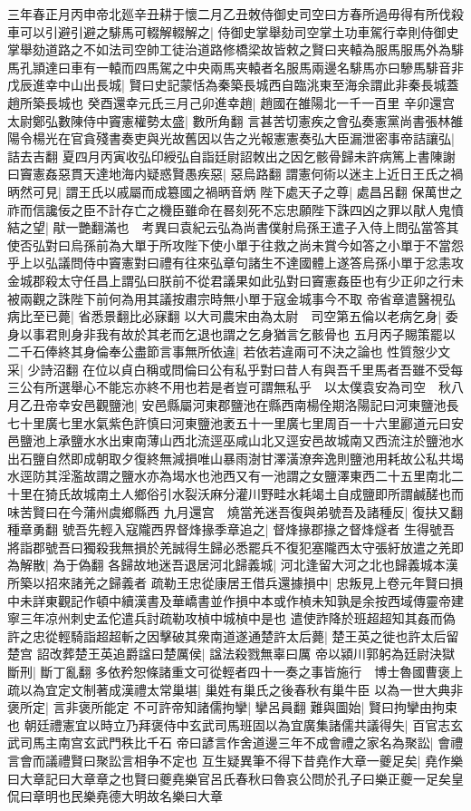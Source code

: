 三年春正月丙申帝北廵辛丑耕于懷二月乙丑敇侍御史司空曰方春所過毋得有所伐殺車可以引避引避之騑馬可輟解輟解之|{
	侍御史掌舉劾司空掌土功車駕行幸則侍御史掌舉劾道路之不如法司空帥工徒治道路修橋梁故皆敕之賢曰夹轅為服馬服馬外為騑馬孔頴達曰車有一轅而四馬駕之中央兩馬夹轅者名服馬兩邊名騑馬亦曰驂馬騑音非}
戊辰進幸中山出長城|{
	賢曰史記蒙恬為秦築長城西自臨洮東至海余謂此非秦長城蓋趙所築長城也}
癸酉還幸元氏三月己卯進幸趙|{
	趙國在雒陽北一千一百里}
辛卯還宫太尉鄭弘數陳侍中竇憲權勢太盛|{
	數所角翻}
言甚苦切憲疾之會弘奏憲黨尚書張林雒陽令楊光在官貪殘書奏吏與光故舊因以告之光報憲憲奏弘大臣漏泄密事帝詰讓弘|{
	詰去吉翻}
夏四月丙寅收弘印綬弘自詣廷尉詔敇出之因乞骸骨歸未許病篤上書陳謝曰竇憲姦惡貫天達地海内疑惑賢愚疾惡|{
	惡烏路翻}
謂憲何術以迷主上近日王氏之禍昞然可見|{
	謂王氏以戚屬而成簒國之禍昞音炳}
陛下處天子之尊|{
	處昌呂翻}
保萬世之祚而信讒佞之臣不計存亡之機臣雖命在晷刻死不忘忠願陛下誅四凶之罪以猒人鬼憤結之望|{
	猒一艷翻滿也　考異曰袁紀云弘為尚書僕射烏孫王遣子入侍上問弘當答其使否弘對曰烏孫前為大單于所攻陛下使小單于往救之尚未賞今如答之小單于不當怨乎上以弘議問侍中竇憲對曰禮有往來弘章句諸生不達國體上遂答烏孫小單于忿恚攻金城郡殺太守任昌上謂弘曰朕前不從君議果如此弘對曰竇憲姦臣也有少正卯之行未被兩觀之誅陛下前何為用其議按肅宗時無小單于寇金城事今不取}
帝省章遣醫視弘病比至已薨|{
	省悉景翻比必寐翻}
以大司農宋由為太尉　司空第五倫以老病乞身|{
	委身以事君則身非我有故於其老而乞退也謂之乞身猶言乞骸骨也}
五月丙子賜策罷以二千石俸終其身倫奉公盡節言事無所依違|{
	若依若違兩可不決之論也}
性質慤少文采|{
	少詩沼翻}
在位以貞白稱或問倫曰公有私乎對曰昔人有與吾千里馬者吾雖不受每三公有所選舉心不能忘亦終不用也若是者豈可謂無私乎　以太僕袁安為司空　秋八月乙丑帝幸安邑觀鹽池|{
	安邑縣屬河東郡鹽池在縣西南楊佺期洛陽記曰河東鹽池長七十里廣七里水氣紫色許慎曰河東鹽池袤五十一里廣七里周百一十六里酈道元曰安邑鹽池上承鹽水水出東南薄山西北流逕巫咸山北又逕安邑故城南又西流注於鹽池水出石鹽自然即成朝取夕復終無減損唯山暴雨澍甘澤潢潦奔逸則鹽池用耗故公私共堨水逕防其淫濫故謂之鹽水亦為堨水也池西又有一池謂之女鹽澤東西二十五里南北二十里在猗氏故城南土人鄉俗引水裂沃麻分灌川野畦水耗竭土自成鹽即所謂鹹醝也而味苦賢曰在今蒲州虞鄉縣西}
九月還宫　燒當羌迷吾復與弟號吾及諸種反|{
	復扶又翻種章勇翻}
號吾先輕入寇隴西界督烽掾季章追之|{
	督烽掾郡掾之督烽燧者}
生得號吾將詣郡號吾曰獨殺我無損於羌誠得生歸必悉罷兵不復犯塞隴西太守張紆放遣之羌即為解散|{
	為于偽翻}
各歸故地迷吾退居河北歸義城|{
	河北逢留大河之北也歸義城本漢所築以招來諸羌之歸義者}
疏勒王忠從康居王借兵還據損中|{
	忠叛見上卷元年賢曰損中未詳東觀記作頓中續漢書及華嶠書並作損中本或作楨未知孰是余按西域傳靈帝建寧三年凉州刺史孟佗遣兵討疏勒攻楨中城楨中是也}
遣使詐降於班超超知其姦而偽許之忠從輕騎詣超超斬之因擊破其衆南道遂通楚許太后薨|{
	楚王英之徙也許太后留楚宫}
詔改葬楚王英追爵諡曰楚厲侯|{
	諡法殺戮無辜曰厲}
帝以潁川郭躬為廷尉決獄斷刑|{
	斷丁亂翻}
多依矜恕條諸重文可從輕者四十一奏之事皆施行　博士魯國曹褒上疏以為宜定文制著成漢禮太常巢堪|{
	巢姓有巢氏之後春秋有巢牛臣}
以為一世大典非褒所定|{
	言非褒所能定}
不可許帝知諸儒拘攣|{
	攣呂員翻}
難與圖始|{
	賢曰拘攣由拘束也}
朝廷禮憲宜以時立乃拜褒侍中玄武司馬班固以為宜廣集諸儒共議得失|{
	百官志玄武司馬主南宫玄武門秩比千石}
帝曰諺言作舍道邊三年不成會禮之家名為聚訟|{
	會禮言會而議禮賢曰聚訟言相争不定也}
互生疑異筆不得下昔堯作大章一夔足矣|{
	堯作樂曰大章記曰大章章之也賢曰夔堯樂官呂氏春秋曰魯哀公問於孔子曰樂正夔一足矣皇侃曰章明也民樂堯德大明故名樂曰大章}


